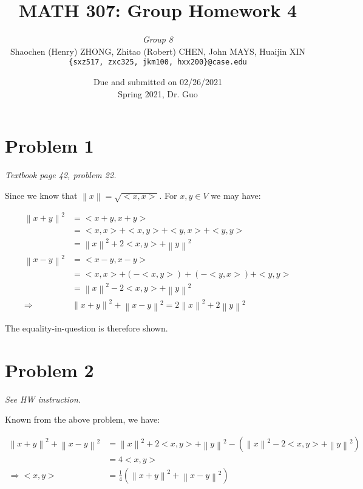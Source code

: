 \documentclass[11pt]{article}
\newcommand{\ilc}{\texttt}
\providecommand{\norm}[1]{\left\lVert #1 \right\rVert}
\begin{document}
\title{\textbf{MATH 307: Group Homework 4}}


\author{\textit{Group 8}\\
Shaochen (Henry) ZHONG, Zhitao (Robert) CHEN, John MAYS, Huaijin XIN\\ \ilc{\{sxz517, zxc325, jkm100, hxx200\}@case.edu}}

\date{Due and submitted on 02/26/2021 \\ Spring 2021, Dr. Guo}
\maketitle



\section*{Problem 1}
\textit{Textbook page 42, problem 22.}\newline

Since we know that $\norm{x} = \sqrt{<x, x>}$. For $x, y \in V$ we may have:

\begin{align*}
    \norm{x + y}^2 &= <x + y, x + y> \\
    &= <x, x> + <x, y> + <y, x> + <y, y> \\
    &= \norm{x}^2 + 2<x, y> + \norm{y}^2 \\
    \norm{x - y}^2 &= <x - y, x - y> \\
    &= <x, x> + (-<x, y>) + (-<y, x>) + <y, y> \\
    &= \norm{x}^2 - 2<x, y> + \norm{y}^2 \\
    \Longrightarrow& \norm{x + y}^2 + \norm{x - y}^2 = 2\norm{x}^2 + 2\norm{y}^2
\end{align*}

The equality-in-question is therefore shown.

\section*{Problem 2}
\textit{See HW instruction.}\newline

Known from the above problem, we have:

\begin{align*}
    \norm{x + y}^2 + \norm{x - y}^2 &= \norm{x}^2 + 2<x, y> + \norm{y}^2  - (\norm{x}^2 - 2<x, y> + \norm{y}^2) \\
    &= 4<x, y> \\
    \Longrightarrow <x, y> &= \frac{1}{4}(\norm{x + y}^2 + \norm{x - y}^2)
\end{align*}
\end{document}
